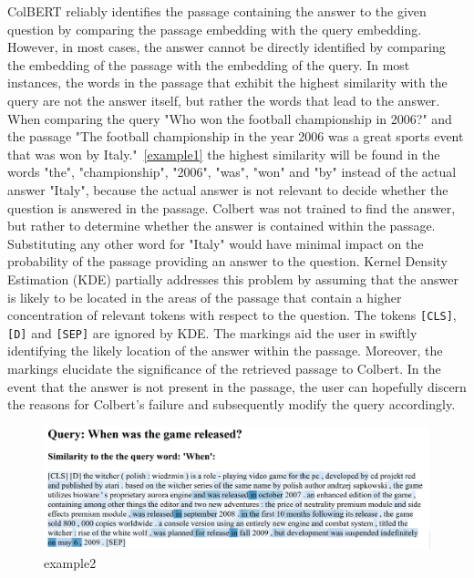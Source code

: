\documentclass{article}
\begin{document}
ColBERT reliably identifies the passage containing the answer to the given question by comparing the passage embedding with the query embedding. 
However, in most cases, the answer cannot be directly identified by comparing the embedding of the passage with the embedding of the query.
In most instances, the words in the passage that exhibit the highest similarity with the query are not the answer itself, but rather the words 
that lead to the answer.
When comparing the query "Who won the football championship in 2006?" and the passage "The football championship in the year 2006 was a great 
sports event that was won by Italy."~\ref{example1} the highest similarity will be found in the words "the", "championship", "2006", "was", 
"won" and "by" instead  of the actual answer "Italy", because the actual answer is not relevant to decide whether the question is answered 
in the passage. 
Colbert was not trained to find the answer, but rather to determine whether the answer is contained within the passage.
Substituting any other word for "Italy" would have minimal impact on the probability of the passage providing an answer to the question.
Kernel Density Estimation (KDE) partially addresses this problem by assuming that the answer is likely to be located in the areas of the passage 
that contain a higher concentration of relevant tokens with respect to the question.
The tokens \texttt{[CLS]}, \texttt{[D]} and \texttt{[SEP]} are ignored by KDE.
The markings aid the user in swiftly identifying the likely location of the answer within the passage. Moreover, the markings elucidate the 
significance of the retrieved passage to Colbert. 
In the event that the answer is not present in the passage, the user can hopefully discern the reasons for Colbert's failure and
subsequently modify the query accordingly.
 
\begin{figure}[h]
	\centering
	\includegraphics[width = 13cm]{"../ressources/results/when_html.png"}
	\caption{example2}
	\label{fig:example2}
\end{figure} 
 
\end{document}
